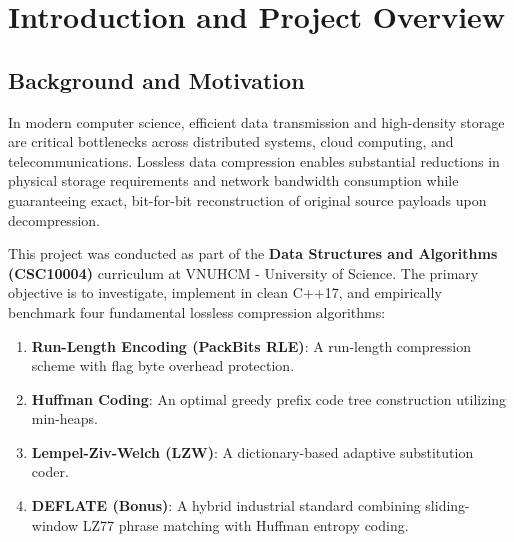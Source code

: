\documentclass[12pt,a4paper]{article}
\begin{document}
\newpage

\tableofcontents
\newpage

\section{Introduction and Project Overview}

\subsection{Background and Motivation}
In modern computer science, efficient data transmission and high-density storage are critical bottlenecks across distributed systems, cloud computing, and telecommunications. Lossless data compression enables substantial reductions in physical storage requirements and network bandwidth consumption while guaranteeing exact, bit-for-bit reconstruction of original source payloads upon decompression.

This project was conducted as part of the \textbf{Data Structures and Algorithms (CSC10004)} curriculum at VNUHCM - University of Science. The primary objective is to investigate, implement in clean C++17, and empirically benchmark four fundamental lossless compression algorithms:
\begin{enumerate}
    \item \textbf{Run-Length Encoding (PackBits RLE)}: A run-length compression scheme with flag byte overhead protection.
    \item \textbf{Huffman Coding}: An optimal greedy prefix code tree construction utilizing min-heaps.
    \item \textbf{Lempel-Ziv-Welch (LZW)}: A dictionary-based adaptive substitution coder.
    \item \textbf{DEFLATE (Bonus)}: A hybrid industrial standard combining sliding-window LZ77 phrase matching with Huffman entropy coding.
\end{enumerate}
\end{document}
